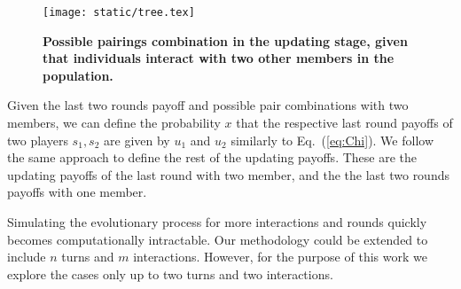 \documentclass[11pt]{article}
\theoremstyle{plainCl1}
\theoremstyle{plainCl2}
\begin{document}
\begin{figure}[!htbp]
  \centering
  \texttt{[image: static/tree.tex]}
  \caption{\textbf{Possible pairings combination in the updating stage, given
  that individuals interact with two other members in the population.}}
  \label{fig:pissible_two_pairs}
\end{figure}

Given the last two rounds payoff and possible pair combinations with two
members, we can define the probability \(x\) that the respective last round
payoffs of two players \(s_1, s_2\) are given by $u_1$ and $u_2$ similarly to
Eq.~(\ref{eq:Chi}). We follow the same approach to define the rest of the
updating payoffs. These are the updating payoffs of the last round with two
member, and the the last two rounds payoffs with one member.

Simulating the evolutionary process for more interactions and rounds quickly
becomes computationally intractable. Our methodology could be extended to
include \(n\) turns and \(m\) interactions. However, for the purpose of this
work we explore the cases only up to two turns and two interactions.



\end{document}
